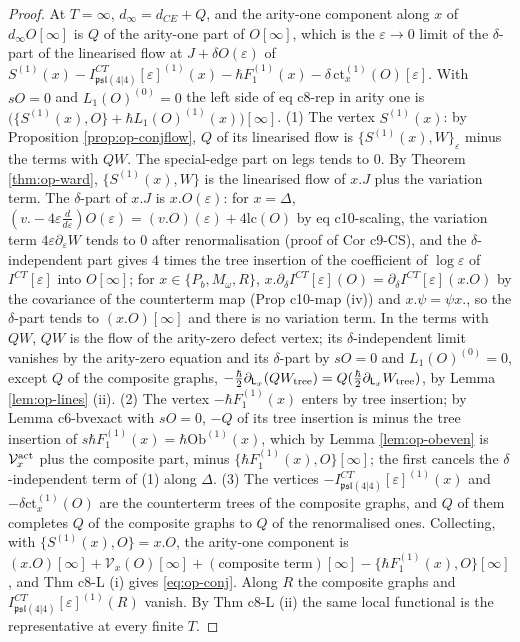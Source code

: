 \documentclass[11pt]{article}
\numberwithin{equation}{section}
\theoremstyle{plain}
\theoremstyle{definition}
\newcommand{\psl}{\mathfrak{psl}(4|4)}
\newcommand{\lc}{\mathrm{lc}}
\newcommand{\ct}{\mathrm{ct}}
\newcommand{\Var}{\mathcal V}
\begin{document}
\begin{proof}
At $T=\infty$, $d_\infty=d_{CE}+Q$, and the arity-one component along $x$ of $d_\infty O[\infty]$ is $Q$ of the arity-one part of $O[\infty]$, which is the $\varepsilon\to0$ limit of the $\delta$-part of the linearised flow at $J+\delta O(\varepsilon)$ of $S^{(1)}(x)-I^{CT}_{\psl}[\varepsilon]^{(1)}(x)-\hbar F_1^{(1)}(x)-\delta\,\ct^{(1)}_x(O)[\varepsilon]$. With $sO=0$ and $L_1(O)^{(0)}=0$ the left side of eq c8-rep in arity one is $\big(\{S^{(1)}(x),O\}+\hbar L_1(O)^{(1)}(x)\big)[\infty]$.
(1) The vertex $S^{(1)}(x)$: by Proposition \ref{prop:op-conjflow}, $Q$ of its linearised flow is $\{S^{(1)}(x),W\}_\varepsilon$ minus the terms with $QW$. The special-edge part on legs tends to $0$. By Theorem \ref{thm:op-ward}, $\{S^{(1)}(x),W\}$ is the linearised flow of $x.J$ plus the variation term. The $\delta$-part of $x.J$ is $x.O(\varepsilon)$: for $x=\Delta$, $(v.-4\varepsilon\frac d{d\varepsilon})O(\varepsilon)=(v.O)(\varepsilon)+4\lc(O)$ by eq c10-scaling, the variation term $4\varepsilon\partial_\varepsilon W$ tends to $0$ after renormalisation (proof of Cor c9-CS), and the $\delta$-independent part gives $4$ times the tree insertion of the coefficient of $\log\varepsilon$ of $I^{CT}[\varepsilon]$ into $O[\infty]$; for $x\in\{P_b,M_\omega,R\}$, $x.\partial_\delta I^{CT}[\varepsilon](O)=\partial_\delta I^{CT}[\varepsilon](x.O)$ by the covariance of the counterterm map (Prop c10-map (iv)) and $x.\psi=\psi x.$, so the $\delta$-part tends to $(x.O)[\infty]$ and there is no variation term. In the terms with $QW$, $QW$ is the flow of the arity-zero defect vertex; its $\delta$-independent limit vanishes by the arity-zero equation and its $\delta$-part by $sO=0$ and $L_1(O)^{(0)}=0$, except $Q$ of the composite graphs, $-\tfrac\hbar2\partial_{\mathsf L_x}(QW_{\rm tree})=Q(\tfrac\hbar2\partial_{\mathsf L_x}W_{\rm tree})$, by Lemma \ref{lem:op-lines} (ii).
(2) The vertex $-\hbar F_1^{(1)}(x)$ enters by tree insertion; by Lemma c6-bvexact with $sO=0$, $-Q$ of its tree insertion is minus the tree insertion of $s\hbar F_1^{(1)}(x)=\hbar\mathrm{Ob}^{(1)}(x)$, which by Lemma \ref{lem:op-obeven} is $\Var^{\rm act}_x$ plus the composite part, minus $\{\hbar F_1^{(1)}(x),O\}[\infty]$; the first cancels the $\delta$-independent term of (1) along $\Delta$.
(3) The vertices $-I^{CT}_{\psl}[\varepsilon]^{(1)}(x)$ and $-\delta\ct^{(1)}_x(O)$ are the counterterm trees of the composite graphs, and $Q$ of them completes $Q$ of the composite graphs to $Q$ of the renormalised ones.
Collecting, with $\{S^{(1)}(x),O\}=x.O$, the arity-one component is $(x.O)[\infty]+\Var_x(O)[\infty]+(\text{composite term})[\infty]-\{\hbar F_1^{(1)}(x),O\}[\infty]$, and Thm c8-L (i) gives \eqref{eq:op-conj}. Along $R$ the composite graphs and $I^{CT}_{\psl}[\varepsilon]^{(1)}(R)$ vanish. By Thm c8-L (ii) the same local functional is the representative at every finite $T$.
\end{proof}
\end{document}
